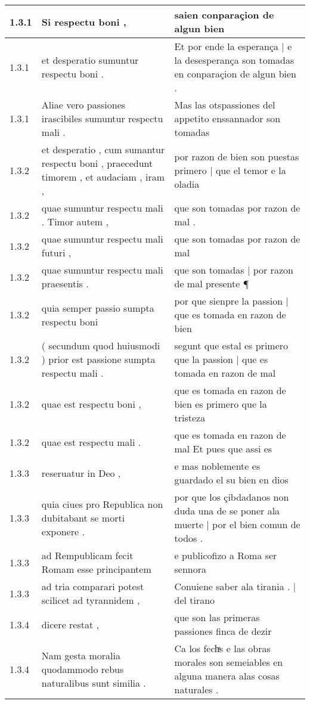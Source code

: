 \begin{tabular}{|p{1cm}|p{6.5cm}|p{6.5cm}|}
1.3.1 & Si respectu boni , & saien conparaçion de algun bien \\\hline
1.3.1 & et desperatio sumuntur respectu boni . & Et por ende la esperança | e la desesperança son tomadas en conparaçion de algun bien . \\\hline
1.3.1 & Aliae vero passiones irascibiles sumuntur respectu mali . & Mas las otspassiones del appetito enssannador son tomadas \\\hline
1.3.2 & et desperatio , cum sumantur respectu boni , praecedunt timorem , et audaciam , iram , & por razon de bien son puestas primero | que el temor e la oladia \\\hline
1.3.2 & quae sumuntur respectu mali . Timor autem , & que son tomadas por razon de mal . \\\hline
1.3.2 & quae sumuntur respectu mali futuri , & que son tomadas por razon de mal \\\hline
1.3.2 & quae sumuntur respectu mali praesentis . & que son tomadas | por razon de mal presente ¶ \\\hline
1.3.2 & quia semper passio sumpta respectu boni & por que sienpre la passion | que es tomada en razon de bien \\\hline
1.3.2 & ( secundum quod huiusmodi ) prior est passione sumpta respectu mali . & segunt que estal es primero que la passion | que es tomada en razon de mal \\\hline
1.3.2 & quae est respectu boni , & que es tomada en razon de bien es primero que la tristeza \\\hline
1.3.2 & quae est respectu mali . & que es tomada en razon de mal Et pues que assi es \\\hline
1.3.3 & reseruatur in Deo , & e mas noblemente es guardado el su bien en dios \\\hline
1.3.3 & quia ciues pro Republica non dubitabant se morti exponere . & por que los çibdadanos non duda una de se poner ala muerte | por el bien comun de todos . \\\hline
1.3.3 & ad Rempublicam fecit Romam esse principantem & e publicofizo a Roma ser sennora \\\hline
1.3.3 & ad tria comparari potest scilicet ad tyrannidem , & Conuiene saber ala tirania . | del tirano \\\hline
1.3.4 & dicere restat , & que son las primeras passiones finca de dezir \\\hline
1.3.4 & Nam gesta moralia quodammodo rebus naturalibus sunt similia . & Ca los fechͣs e las obras morales son semeiables en alguna manera alas cosas naturales . \\\hline

\end{tabular}
